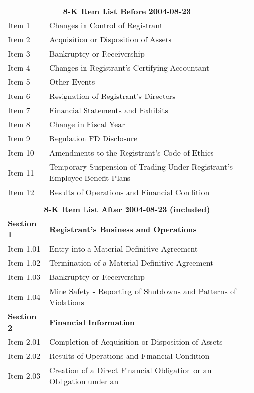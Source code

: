
\begin{table}[H]
  \centering
  \begin{small}
    \begin{tabular}{ll}
    \multicolumn{2}{c}{\textbf{8-K Item List Before 2004-08-23}} \\
    Item 1 & Changes in Control of Registrant \\
    Item 2 & Acquisition or Disposition of Assets \\
    Item 3 & Bankruptcy or Receivership \\
    Item 4 & Changes in Registrant's Certifying Accountant \\
    Item 5 & Other Events \\
    Item 6 & Resignation of Registrant's Directors \\
    Item 7 & Financial Statements and Exhibits \\
    Item 8 & Change in Fiscal Year \\
    Item 9 & Regulation FD Disclosure \\
    Item 10 & Amendments to the Registrant's Code of Ethics \\
    Item 11 & Temporary Suspension of Trading Under Registrant's Employee Benefit Plans \\
    Item 12 & Results of Operations and Financial Condition \\
      &  \\
    \multicolumn{2}{c}{\textbf{8-K Item List After 2004-08-23 (included)}} \\
    \textbf{Section 1} & \textbf{Registrant's Business and Operations} \\
    Item 1.01 & Entry into a Material Definitive Agreement \\
    Item 1.02 & Termination of a Material Definitive Agreement \\
    Item 1.03 & Bankruptcy or Receivership \\
    Item 1.04 & Mine Safety - Reporting of Shutdowns and Patterns of Violations \\
    \textbf{Section 2} & \textbf{Financial Information} \\
    Item 2.01 & Completion of Acquisition or Disposition of Assets \\
    Item 2.02 & Results of Operations and Financial Condition \\
    Item 2.03 & Creation of a Direct Financial Obligation or an Obligation under an \\

\end{tabular}
\end{small}
\end{table}
